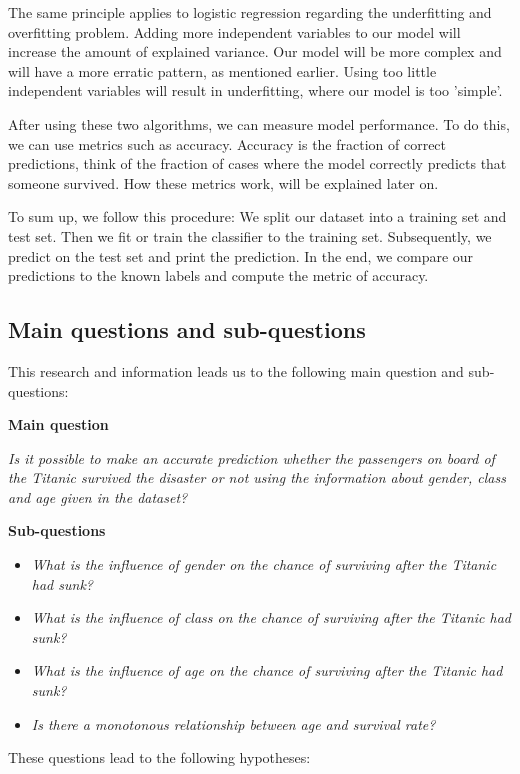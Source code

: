 \documentclass[11pt]{article}
\begin{document}
The same principle applies to logistic regression regarding the underfitting and overfitting problem. Adding more independent variables to our model will increase the amount of explained variance. Our model will be more complex and will have a more erratic pattern, as mentioned earlier. Using too little independent variables will result in underfitting, where our model is too 'simple'. 

After using these two algorithms, we can measure model performance. To do this, we can use metrics such as accuracy. Accuracy is the fraction of correct predictions, think of the fraction of cases where the model correctly predicts that someone survived. How these metrics work, will be explained later on. 

To sum up, we follow this procedure: We split our dataset into a training set and test set. Then we fit or train the classifier to the training set. Subsequently, we predict on the test set and print the prediction. In the end, we compare our predictions to the known labels and compute the metric of accuracy. 

\subsection{Main questions and sub-questions}
\label{sec:orgb785349}
This research and information leads us to the following main question and sub-questions: 

\textbf{Main question}

\emph{Is it possible to make an accurate prediction whether the passengers on board of the Titanic survived the disaster or not using the information about gender, class and age given in the dataset?}

\textbf{Sub-questions} 

\begin{itemize}
\item \emph{What is the influence of gender on the chance of surviving after the Titanic had sunk?}
\item \emph{What is the influence of class on the chance of surviving after the Titanic had sunk?}
\item \emph{What is the influence of age on the chance of surviving after the Titanic had sunk?}
\item \emph{Is there a monotonous relationship between age and survival rate?}
\end{itemize}

These questions lead to the following hypotheses:
\end{document}
